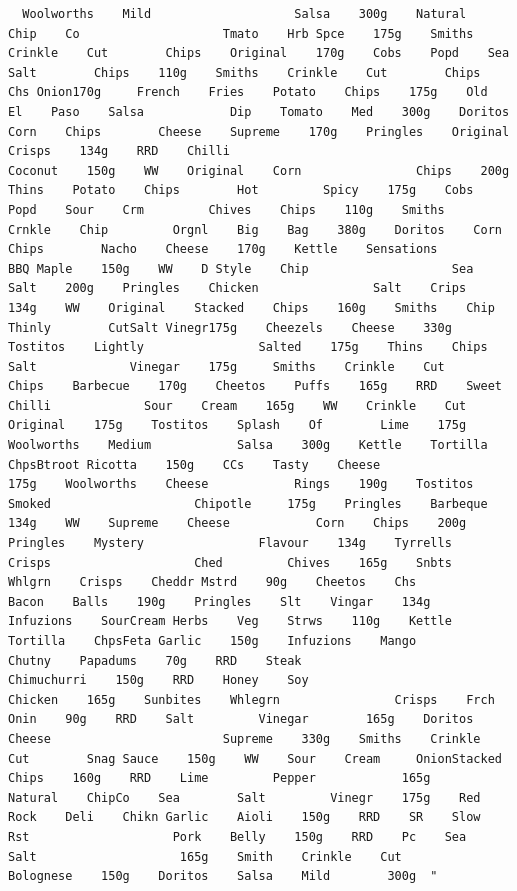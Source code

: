 \documentclass[
]{article}
\begin{document}
\begin{verbatim}
  Woolworths    Mild                    Salsa    300g    Natural    Chip    Co                    Tmato    Hrb Spce    175g    Smiths    Crinkle    Cut        Chips    Original    170g    Cobs    Popd    Sea    Salt        Chips    110g    Smiths    Crinkle    Cut        Chips    Chs Onion170g     French    Fries    Potato    Chips    175g    Old    El    Paso    Salsa            Dip    Tomato    Med    300g    Doritos    Corn    Chips        Cheese    Supreme    170g    Pringles    Original            Crisps    134g    RRD    Chilli                                     Coconut    150g    WW    Original    Corn                Chips    200g    Thins    Potato    Chips        Hot         Spicy    175g    Cobs    Popd    Sour    Crm         Chives    Chips    110g    Smiths    Crnkle    Chip         Orgnl    Big    Bag    380g    Doritos    Corn    Chips        Nacho    Cheese    170g    Kettle    Sensations            BBQ Maple    150g    WW    D Style    Chip                    Sea    Salt    200g    Pringles    Chicken                Salt    Crips    134g    WW    Original    Stacked    Chips    160g    Smiths    Chip    Thinly        CutSalt Vinegr175g    Cheezels    Cheese    330g    Tostitos    Lightly                Salted    175g    Thins    Chips    Salt             Vinegar    175g     Smiths    Crinkle    Cut        Chips    Barbecue    170g    Cheetos    Puffs    165g    RRD    Sweet    Chilli             Sour    Cream    165g    WW    Crinkle    Cut                        Original    175g    Tostitos    Splash    Of        Lime    175g    Woolworths    Medium            Salsa    300g    Kettle    Tortilla    ChpsBtroot Ricotta    150g    CCs    Tasty    Cheese                175g    Woolworths    Cheese            Rings    190g    Tostitos    Smoked                    Chipotle     175g    Pringles    Barbeque            134g    WW    Supreme    Cheese            Corn    Chips    200g    Pringles    Mystery                Flavour    134g    Tyrrells    Crisps                    Ched         Chives    165g    Snbts    Whlgrn    Crisps    Cheddr Mstrd    90g    Cheetos    Chs         Bacon    Balls    190g    Pringles    Slt    Vingar    134g    Infuzions    SourCream Herbs    Veg    Strws    110g    Kettle    Tortilla    ChpsFeta Garlic    150g    Infuzions    Mango                     Chutny    Papadums    70g    RRD    Steak                                         Chimuchurri    150g    RRD    Honey    Soy                            Chicken    165g    Sunbites    Whlegrn                Crisps    Frch Onin    90g    RRD    Salt         Vinegar        165g    Doritos    Cheese                        Supreme    330g    Smiths    Crinkle    Cut        Snag Sauce    150g    WW    Sour    Cream     OnionStacked    Chips    160g    RRD    Lime         Pepper            165g     Natural    ChipCo    Sea        Salt         Vinegr    175g    Red    Rock    Deli    Chikn Garlic    Aioli    150g    RRD    SR    Slow    Rst                    Pork    Belly    150g    RRD    Pc    Sea    Salt                    165g    Smith    Crinkle    Cut            Bolognese    150g    Doritos    Salsa    Mild        300g  "
\end{verbatim}
\end{document}
